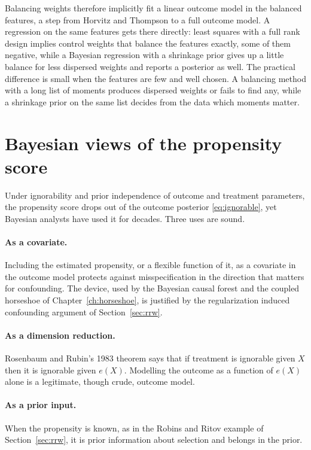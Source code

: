 Balancing weights therefore implicitly fit a linear outcome model in the balanced features, a step from Horvitz and Thompson to a full outcome model. A regression on the same features gets there directly: least squares with a full rank design implies control weights that balance the features exactly, some of them negative, while a Bayesian regression with a shrinkage prior gives up a little balance for less dispersed weights and reports a posterior as well. The practical difference is small when the features are few and well chosen. A balancing method with a long list of moments produces dispersed weights or fails to find any, while a shrinkage prior on the same list decides from the data which moments matter.

\section{Bayesian views of the propensity score}

Under ignorability and prior independence of outcome and treatment parameters, the propensity score drops out of the outcome posterior \eqref{eq:ignorable}, yet Bayesian analysts have used it for decades. Three uses are sound.

\paragraph{As a covariate.} Including the estimated propensity, or a flexible function of it, as a covariate in the outcome model protects against misspecification in the direction that matters for confounding. The device, used by the Bayesian causal forest and the coupled horseshoe of Chapter~\ref{ch:horseshoe}, is justified by the regularization induced confounding argument of Section~\ref{sec:rrw}.

\paragraph{As a dimension reduction.} Rosenbaum and Rubin's 1983 theorem says that if treatment is ignorable given $X$ then it is ignorable given $e(X)$. Modelling the outcome as a function of $e(X)$ alone is a legitimate, though crude, outcome model.

\paragraph{As a prior input.} When the propensity is known, as in the Robins and Ritov example of Section~\ref{sec:rrw}, it is prior information about selection and belongs in the prior.

